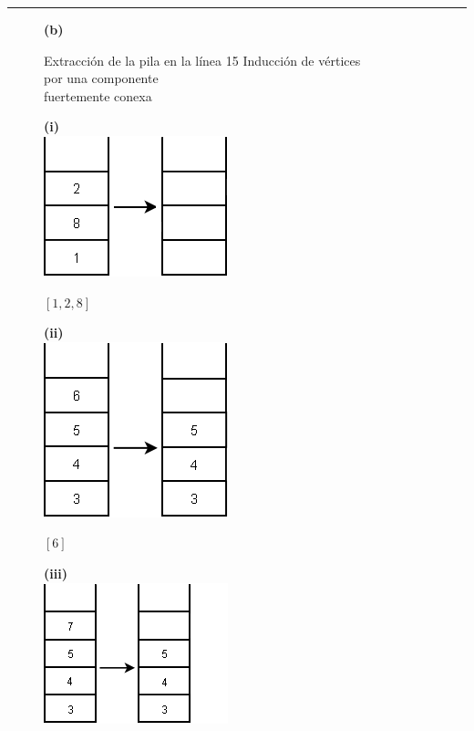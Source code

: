 \documentclass[10pt,a5paper]{book}
\begin{document}
\hrule
\begin{figure}[H]
\begin{flushleft} \textbf{(b)} \end{flushleft}
\begin{center} Extracción de la pila en la línea 15 \hspace*{0.25in} Inducción de vértices\\ \hspace*{2.4in}por una componente \\ \hspace*{2.4in}fuertemente conexa\end{center}
\begin{center}
\parbox{3cm}
{
  \textbf{(i)}\\
    \includegraphics[scale=0.5]{Fig1_21_b1.png}
}
\hspace*{1in}
\parbox{2cm}
{
$ [1,2,8] $
}
\end{center}
\begin{center}
\parbox{3cm}
{
  \textbf{(ii)}\\
    \includegraphics[scale=0.5]{Fig1_21_b2.png}
}
\hspace*{1in}
\parbox{2cm}
{
$ [6] $
}
\end{center}
\begin{center}
\parbox{3cm}
{
  \textbf{(iii)}\\
    \includegraphics[scale=0.5]{Fig1_21_b3.png}
}
\end{center}
\end{figure}
\end{document}
